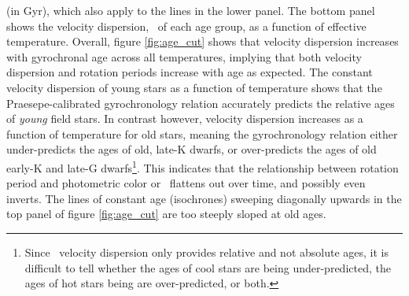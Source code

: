 (in Gyr), which also apply to the lines in the lower panel.
The bottom panel shows the velocity dispersion, \sigmavb\ of each age group,
as a function of effective temperature.
Overall, figure \ref{fig:age_cut} shows that velocity dispersion increases
with gyrochronal age across all temperatures, implying that both velocity
dispersion and rotation periods increase with age as expected.
The constant velocity dispersion of young stars as a function of temperature
shows that the Praesepe-calibrated gyrochronology relation accurately predicts
the relative ages of {\it young} field stars.
In contrast however, velocity dispersion increases as a function of
temperature for old stars, meaning the \citet{angus2019} gyrochronology
relation either under-predicts the ages of old, late-K dwarfs, or
over-predicts the ages of old early-K and late-G dwarfs\footnote{Since \vb\
velocity dispersion only provides relative and not absolute ages, it is
difficult to tell whether the ages of cool stars are being under-predicted,
the ages of hot stars being are over-predicted, or both.}.
This indicates that the relationship between rotation period and photometric
color or \teff\ flattens out over time, and possibly even inverts.
The lines of constant age (isochrones) sweeping diagonally upwards in the top
panel of figure \ref{fig:age_cut} are too steeply sloped at old ages.

